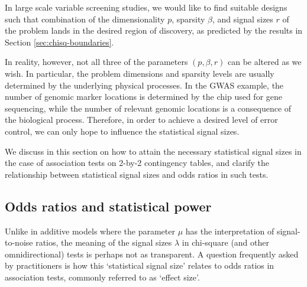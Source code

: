 
In large scale variable screening studies, we would like to find suitable designs such that combination of the dimensionality $p$, sparsity $\beta$, and signal sizes $r$ of the problem lands in the desired region of discovery, as predicted by the results in Section \ref{sec:chisq-boundaries}.

In reality, however, not all three of the parameters $(p, \beta, r)$ can be altered as we wish.
In particular, the problem dimensions and sparsity levels are usually determined by the underlying physical processes.
In the GWAS example, the number of genomic marker locations is determined by the chip used for gene sequencing, while the number of relevant genomic locations is a consequence of the biological process.
Therefore, in order to achieve a desired level of error control, we can only hope to influence the statistical signal sizes.

We discuss in this section on how to attain the necessary statistical signal sizes in the case of association tests on 2-by-2 contingency tables, and clarify the relationship between statistical signal sizes and odds ratios in such tests.

\subsection{Odds ratios and statistical power}
\label{subsec:odds-and-power}

Unlike in additive models where the parameter $\mu$ has the interpretation of signal-to-noise ratios, the meaning of the signal sizes $\lambda$ in chi-square (and other omnidirectional) tests is perhaps not as transparent.
A question frequently asked by practitioners is how this `statistical signal size' relates to odds ratios in association tests, commonly referred to as `effect size'.

